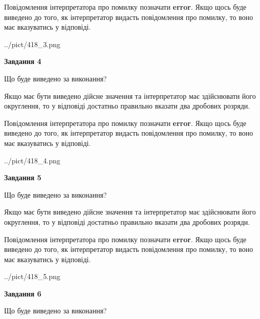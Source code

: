 \documentclass[12pt, ukrainian]{article}
\begin{document}
{\begin {Large}
Повідомлення інтерпретатора про помилку позначати \textbf{error}.
Якщо щось буде виведено до того, як інтерпретатор видасть повідомлення про помилку, 
то воно має вказуватись у відповіді. \par

\begin{center}
	{../pict/418_3.png}
\end{center}
\newpage

{\begin {center}\textbf{Завдання 4}\end {center}}\par
Що буде виведено за виконання? \par

Якщо має бути виведено дійсне значення та інтерпретатор має здійснювати його округлення, 
то у відповіді достатньо правильно вказати два дробових розряди.

Повідомлення інтерпретатора про помилку позначати \textbf{error}.
Якщо щось буде виведено до того, як інтерпретатор видасть повідомлення про помилку, 
то воно має вказуватись у відповіді. \par

\begin{center}
	{../pict/418_4.png}
\end{center}
\newpage

{\begin {center}\textbf{Завдання 5}\end {center}}\par
Що буде виведено за виконання? \par

Якщо має бути виведено дійсне значення та інтерпретатор має здійснювати його округлення, 
то у відповіді достатньо правильно вказати два дробових розряди.

Повідомлення інтерпретатора про помилку позначати \textbf{error}.
Якщо щось буде виведено до того, як інтерпретатор видасть повідомлення про помилку, 
то воно має вказуватись у відповіді. \par

\begin{center}
	{../pict/418_5.png}
\end{center}
\newpage

{\begin {center}\textbf{Завдання 6}\end {center}}\par
Що буде виведено за виконання? \par


\end{Large}}
\end{document}
